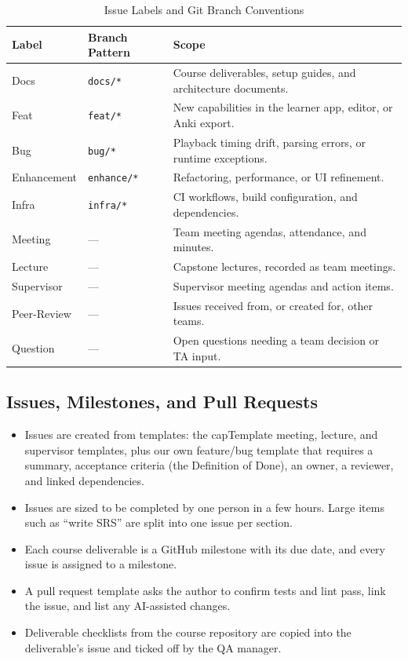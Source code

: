 \documentclass{article}
\begin{document}
\begin{table}[hp]
\caption{Issue Labels and Git Branch Conventions} \label{TblBranchNaming}
\begin{tabularx}{\textwidth}{llX}
\toprule
\textbf{Label} & \textbf{Branch Pattern} & \textbf{Scope}\\
\midrule
Docs & \texttt{docs/*} & Course deliverables, setup guides, and architecture documents.\\
Feat & \texttt{feat/*} & New capabilities in the learner app, editor, or Anki export.\\
Bug & \texttt{bug/*} & Playback timing drift, parsing errors, or runtime exceptions.\\
Enhancement & \texttt{enhance/*} & Refactoring, performance, or UI refinement.\\
Infra & \texttt{infra/*} & CI workflows, build configuration, and dependencies.\\
Meeting & --- & Team meeting agendas, attendance, and minutes.\\
Lecture & --- & Capstone lectures, recorded as team meetings.\\
Supervisor & --- & Supervisor meeting agendas and action items.\\
Peer-Review & --- & Issues received from, or created for, other teams.\\
Question & --- & Open questions needing a team decision or TA input.\\
\bottomrule
\end{tabularx}
\end{table}

\subsection{Issues, Milestones, and Pull Requests}
\begin{itemize}
    \item Issues are created from templates: the capTemplate meeting, lecture,
    and supervisor templates, plus our own feature/bug template that requires a
    summary, acceptance criteria (the Definition of Done), an owner, a reviewer,
    and linked dependencies.
    \item Issues are sized to be completed by one person in a few hours. Large
    items such as ``write SRS'' are split into one issue per section.
    \item Each course deliverable is a GitHub milestone with its due date, and
    every issue is assigned to a milestone.
    \item A pull request template asks the author to confirm tests and lint
    pass, link the issue, and list any AI-assisted changes.
    \item Deliverable checklists from the course repository are copied into the
    deliverable's issue and ticked off by the QA manager.
\end{itemize}
\end{document}
